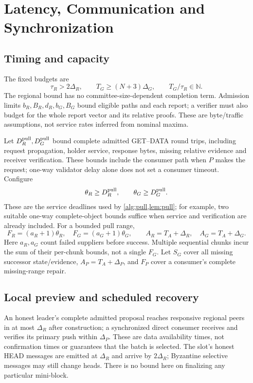 \documentclass[11pt,a4paper,onecolumn]{article}
\theoremstyle{remark}\newtheorem{example}[definition]{Example}
\begin{document}
\section{Latency, Communication and Synchronization}\label{sec:complexity}
\subsection{Timing and capacity}\label{sec:latency}
The fixed budgets are
\begin{equation}\label{eq:spacing}
 \tau_R>2\Delta_R,\qquad T_G\geq(N+3)\Delta_G,\qquad
 T_G/\tau_R\in\mathbb N.
\end{equation}
The regional bound has no committee-size-dependent completion term. Admission
limits $b_R,B_R,d_R,b_G,B_G$ bound eligible paths and each report; a verifier
must also budget for the whole report vector and its relative proofs. These
are byte/traffic assumptions, not service rates inferred from nominal maxima.

Let $D_R^{\rm pull},D_G^{\rm pull}$ bound complete admitted GET--DATA
round trips, including request propagation, holder service, response bytes,
missing relative evidence and receiver verification. These bounds include
the consumer path when $P$ makes the request; one-way validator delay alone
does not set a consumer timeout. Configure
\[
 \theta_R\geq D_R^{\rm pull},\qquad
 \theta_G\geq D_G^{\rm pull}.
\]
These are the service deadlines used by \cref{alg:pull,lem:pull}; for example,
two suitable one-way complete-object bounds suffice when service and
verification are already included. For a bounded pull range,
\[
 F_R=(a_R+1)\theta_R,\quad F_G=(a_G+1)\theta_G,
 \qquad A_R=T_A+\Delta_R,\quad A_G=T_A+\Delta_G.
\]
Here $a_R,a_G$ count failed suppliers before success. Multiple sequential
chunks incur the sum of their per-chunk bounds, not a single $F_G$.
Let $S_G$ cover all missing successor state/evidence, $A_P=T_A+\Delta_P$,
and $F_P$ cover a consumer's complete missing-range repair.

\subsection{Local preview and scheduled recovery}
An honest leader's complete admitted proposal reaches responsive regional
peers in at most $\Delta_R$ after construction; a synchronized direct consumer
receives and verifies its primary push within $\Delta_P$. These are data
availability times, not confirmation times or guarantees that the batch is
selected. The slot's honest HEAD messages are emitted at $\Delta_R$ and
arrive by $2\Delta_R$; Byzantine selective messages may still change heads.
There is no bound here on finalizing any particular mini-block.
\end{document}
